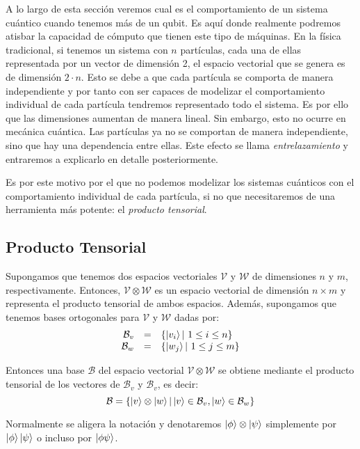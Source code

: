 A lo largo de esta sección veremos cual es el comportamiento de un sistema cuántico cuando tenemos más de un qubit. Es aquí donde realmente podremos atisbar la capacidad de cómputo que tienen este tipo de máquinas.
%
En la física tradicional, si tenemos un sistema con $n$ partículas, cada una de ellas representada por un vector de dimensión 2, el espacio vectorial que se genera es de dimensión $2\cdot n$. Esto se debe a que cada partícula se comporta de manera independiente y por tanto con ser capaces de modelizar el comportamiento individual de cada partícula tendremos representado todo el sistema. Es por ello que las dimensiones aumentan de manera lineal.
%
Sin embargo, esto no ocurre en mecánica cuántica. Las partículas ya no se comportan de manera independiente, sino que hay una dependencia entre ellas. Este efecto se llama \textit{entrelazamiento} y entraremos a explicarlo en detalle posteriormente. 

Es por este motivo por el que no podemos modelizar los sistemas cuánticos con el comportamiento individual de cada partícula, si no que necesitaremos de una herramienta más potente: el \textit{producto tensorial}.

\subsection{Producto Tensorial}

Supongamos que tenemos dos espacios vectoriales $\mathcal{V}$ y $\mathcal{W}$ de dimensiones $n$ y $m$, respectivamente. Entonces, $\mathcal{V}\otimes\mathcal{W}$ es un espacio vectorial de dimensión $n\times m$ y representa el producto tensorial de ambos espacios.
%
Además, supongamos que tenemos bases ortogonales para $\mathcal{V}$ y $\mathcal{W}$ dadas por:
$$
\begin{array}{rcl}
\mathcal{B}_v &=&\{\left|v_i\right\rangle |\ 1 \leq i \leq n \} \\
\mathcal{B}_w &=&\{\left|w_j\right\rangle |\ 1 \leq j \leq m \}
\end{array}
$$

Entonces una base $\mathcal{B}$ del espacio vectorial $\mathcal{V}\otimes\mathcal{W}$ se obtiene mediante el producto tensorial de los vectores de $\mathcal{B}_v$  y $\mathcal{B}_v$, es decir:
$$
\mathcal{B} = \{\left|v\right\rangle\otimes\left|w\right\rangle|\left|v\right\rangle\in\mathcal{B}_v,\left|w\right\rangle\in\mathcal{B}_w\}
$$

Normalmente se aligera la notación y denotaremos $\left|\phi\right\rangle\otimes\left|\psi\right\rangle$ simplemente por $\left|\phi\right\rangle\left|\psi\right\rangle$ o incluso por $\left|\phi\psi\right\rangle$.

